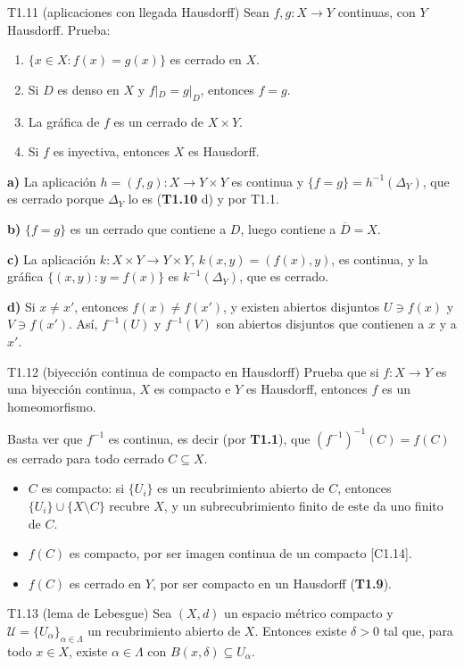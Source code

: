 \begin{ejercicio}{T1.11 (aplicaciones con llegada Hausdorff)}
Sean $f, g \colon X \to Y$ continuas, con $Y$ Hausdorff. Prueba:
\begin{enumerate}
    \item[a)] $\{x \in X : f(x) = g(x)\}$ es cerrado en $X$.
    \item[b)] Si $D$ es denso en $X$ y $f|_D = g|_D$, entonces $f = g$.
    \item[c)] La gráfica de $f$ es un cerrado de $X \times Y$.
    \item[d)] Si $f$ es inyectiva, entonces $X$ es Hausdorff.
\end{enumerate}

\sol \fuentepropia

\textbf{a)} La aplicación $h = (f,g) \colon X \to Y \times Y$ es continua y $\{f = g\} = h^{-1}(\Delta_Y)$, que es cerrado porque $\Delta_Y$ lo es (\textbf{T1.10} d) y por T1.1.

\textbf{b)} $\{f = g\}$ es un cerrado que contiene a $D$, luego contiene a $\overline{D} = X$.

\textbf{c)} La aplicación $k \colon X \times Y \to Y \times Y$, $k(x,y) = (f(x),y)$, es continua, y la gráfica $\{(x,y) : y = f(x)\}$ es $k^{-1}(\Delta_Y)$, que es cerrado.

\textbf{d)} Si $x \neq x'$, entonces $f(x) \neq f(x')$, y existen abiertos disjuntos $U \ni f(x)$ y $V \ni f(x')$. Así, $f^{-1}(U)$ y $f^{-1}(V)$ son abiertos disjuntos que contienen a $x$ y a $x'$.
\end{ejercicio}

\begin{ejercicio}{T1.12 (biyección continua de compacto en Hausdorff)}
Prueba que si $f \colon X \to Y$ es una biyección continua, $X$ es compacto e $Y$ es Hausdorff, entonces $f$ es un homeomorfismo.

\sol \fuentepropia

Basta ver que $f^{-1}$ es continua, es decir (por \textbf{T1.1}), que $(f^{-1})^{-1}(C) = f(C)$ es cerrado para todo cerrado $C \subseteq X$.
\begin{itemize}
    \item $C$ es compacto: si $\{U_i\}$ es un recubrimiento abierto de $C$, entonces $\{U_i\} \cup \{X \setminus C\}$ recubre $X$, y un subrecubrimiento finito de este da uno finito de $C$.
    \item $f(C)$ es compacto, por ser imagen continua de un compacto [C1.14].
    \item $f(C)$ es cerrado en $Y$, por ser compacto en un Hausdorff (\textbf{T1.9}).
\end{itemize}
\end{ejercicio}

\begin{ejercicio}{T1.13 (lema de Lebesgue)}
Sea $(X,d)$ un espacio métrico compacto y $\mathcal{U} = \{U_\alpha\}_{\alpha \in \Lambda}$ un recubrimiento abierto de $X$. Entonces existe $\delta > 0$ tal que, para todo $x \in X$, existe $\alpha \in \Lambda$ con $B(x,\delta) \subseteq U_\alpha$.

\end{ejercicio}
